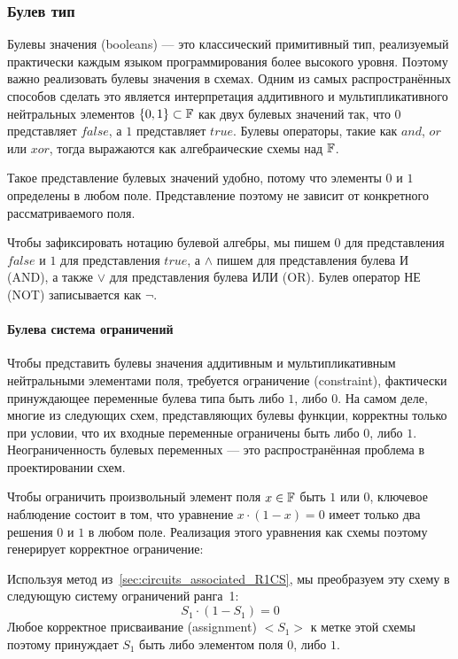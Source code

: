 \subsubsection{Булев тип}
Булевы значения (booleans) --- это классический примитивный тип, реализуемый практически каждым языком программирования более высокого уровня. Поэтому важно реализовать булевы значения в схемах. Одним из самых распространённых способов сделать это является интерпретация аддитивного и мультипликативного нейтральных элементов $\{0,1\}\subset \mathbb{F}$ как двух булевых значений так, что $0$ представляет $false$, а $1$ представляет $true$. Булевы операторы, такие как $and$, $or$ или $xor$, тогда выражаются как алгебраические схемы над $\mathbb{F}$.

Такое представление булевых значений удобно, потому что элементы $0$ и $1$ определены в любом поле. Представление поэтому не зависит от конкретного рассматриваемого поля.

Чтобы зафиксировать нотацию булевой алгебры, мы пишем $0$ для представления $false$ и $1$ для представления $true$, а $\wedge$ пишем для представления булева И (AND), а также $\vee$ для представления булева ИЛИ (OR). Булев оператор НЕ (NOT) записывается как $\lnot$.
\paragraph{Булева система ограничений}
\label{def:boolean_constraint} Чтобы представить булевы значения аддитивным и мультипликативным нейтральными элементами поля, требуется ограничение (constraint), фактически принуждающее переменные булева типа быть либо $1$, либо $0$. На самом деле, многие из следующих схем, представляющих булевы функции, корректны только при условии, что их входные переменные ограничены быть либо $0$, либо $1$. Неограниченность булевых переменных --- это распространённая проблема в проектировании схем.

Чтобы ограничить произвольный элемент поля $x\in \mathbb{F}$ быть $1$ или $0$, ключевое наблюдение состоит в том, что уравнение $x \cdot (1-x) =0$ имеет только два решения $0$ и $1$ в любом поле. Реализация этого уравнения как схемы поэтому генерирует корректное ограничение:
\begin{center}
\end{center}
Используя метод из~\ref{sec:circuits_associated_R1CS}, мы преобразуем эту схему в следующую систему ограничений ранга~1:
$$
S_1 \cdot (1-S_1) = 0
$$
Любое корректное присваивание (assignment) $<S_1>$ к метке этой схемы поэтому принуждает $S_1$ быть либо элементом поля $0$, либо $1$.


